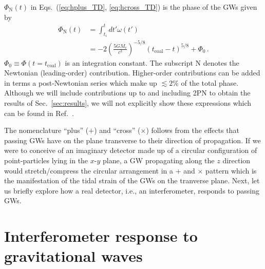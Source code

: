\documentclass[11pt,a4paper]{article}
\newcommand{\f}{\frac}
\newcommand{\nn}{\nonumber}
\begin{document}
$\Phi_\text{N}(t)$ in Eqs.~(\ref{eq:hplus_TD}, \ref{eq:hcross_TD}) is the phase of the GWs given by
%
\begin{align}
\Phi_\text{N}(t) &=\int_{t_i}^t dt' \omega(t') \nn\\
&= -2\left(\f{5 G M_c}{c^3}\right)^{-5/8} (t_\text{coal}-t)^{5/8}+ \Phi_0 \, .\label{eq:Phase}
\end{align}
%
$\Phi_0 \equiv \Phi(t=t_\text{coal})$ is an integration constant. The subscript N denotes the Newtonian (leading-order) contribution. 
Higher-order contributions can be added in terms a post-Newtonian series which make up $\lesssim 2\%$ of the total phase.
Although we will include contributions up to and including 2PN to obtain the results of Sec.~\ref{sec:results}, we will not explicitly show these expressions 
which can be found in Ref.~\cite{Blanchet_LRR}.

The nomenclature ``plus'' ($+$) and ``cross'' ($\times$) follows from the effects that passing GWs have on the plane transverse to their direction of propagation.
If we were to conceive of an imaginary detector made up of a circular configuration of point-particles lying in the $x$-$y$ plane, a GW propagating along the $z$ direction would stretch/compress the circular arrangement in a $+$ and $\times$ pattern which is the manifestation of the tidal strain of the GWs on the tranverse plane.
Next, let us briefly explore how a real detector, i.e., an interferometer, responds to passing GWs.


\section{Interferometer response to gravitational waves}\label{sec:IFO_response}
\end{document}
